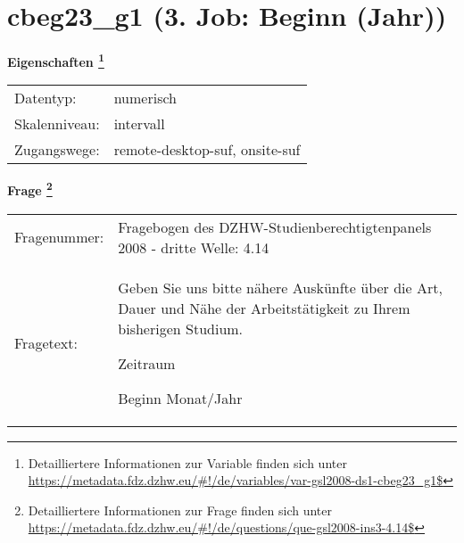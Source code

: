 
    \setcounter{footnote}{0}

    \vspace*{-1.8cm}
	\section{cbeg23\_g1 (3. Job: Beginn (Jahr))}
	\label{section:cbeg23_g1}



    \vspace*{0.5cm}
    \noindent\textbf{Eigenschaften
	\footnote{Detailliertere Informationen zur Variable finden sich unter
		\url{https://metadata.fdz.dzhw.eu/\#!/de/variables/var-gsl2008-ds1-cbeg23_g1$}}}\\
	\begin{tabularx}{\hsize}{@{}lX}
	Datentyp: & numerisch \\
	Skalenniveau: & intervall \\
	Zugangswege: &
	  remote-desktop-suf, 
	  onsite-suf
 \\
    \end{tabularx}



				\vspace*{0.5cm}
                \noindent\textbf{Frage
	                \footnote{Detailliertere Informationen zur Frage finden sich unter
		              \url{https://metadata.fdz.dzhw.eu/\#!/de/questions/que-gsl2008-ins3-4.14$}}}\\
				\begin{tabularx}{\hsize}{@{}lX}
					Fragenummer: &
					  Fragebogen des DZHW-Studienberechtigtenpanels 2008 - dritte Welle:
					  4.14
 \\
					Fragetext: & Geben Sie uns bitte nähere Auskünfte über die Art, Dauer und Nähe der Arbeitstätigkeit zu Ihrem bisherigen Studium.\par  Zeitraum\par  Beginn Monat/Jahr \\
				\end{tabularx}





